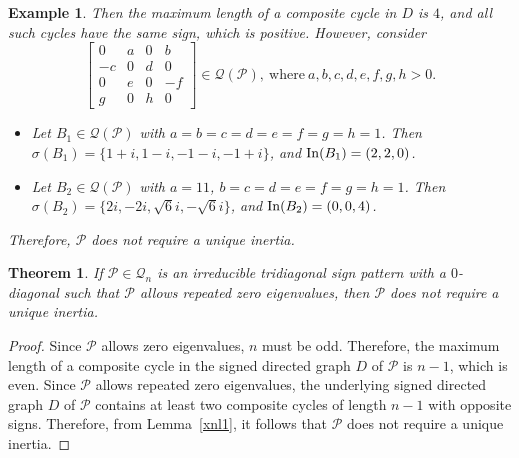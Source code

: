 \documentclass[a4paper, 10pt]{article}
\newtheorem{theorem}{Theorem}[section]
\newtheorem{eg}{Example}[section]
\numberwithin{equation}{section}
\def\In{{\rm In}}
\begin{document}
\begin{eg}
		Then the maximum length of a composite cycle in $D$ is $4$, and all such cycles have the same sign, which is positive. However, consider	$$\begin{bmatrix}
			0&a&0&b\\ -c&0&d&0\\ 0&e&0&-f\\ g&0&h&0
		\end{bmatrix}\in \mathcal{Q}(\mathcal{P}), ~\text{where}~ a,b,c,d,e,f,g,h>0.$$ \begin{itemize}
			\item[i.] Let $B_1 \in \mathcal{Q}(\mathcal{P})$ with $a = b = c = d = e = f = g = h = 1$. Then $\sigma(B_1) = \{1+i, 1-i,-1-i,-1+i\}$, and $\In(B_1) = (2, 2, 0)$.
			\item[ii.] Let $B_2 \in \mathcal{Q}(\mathcal{P})$ with $a = 11$, $ b = c = d = e = f = g = h = 1$. Then $\sigma(B_2) = \{2i,-2i,\sqrt{6}i,-\sqrt{6}i\}$, and $\In(B_2) = (0, 0, 4)$.
		\end{itemize}
		Therefore, $\mathcal{P}$ does not require a unique inertia.
	\end{eg}
	
	\begin{theorem} \label{l3.1n}
		If $\mathcal{P}\in \mathcal{Q}_n$ is an irreducible tridiagonal sign pattern with a $0$-diagonal such that $\mathcal{P}$ allows repeated zero eigenvalues, then $\mathcal{P}$ does not require a unique inertia.
	\end{theorem}
	\begin{proof} Since $\mathcal{P}$ allows zero eigenvalues, $n$ must be odd. Therefore, the maximum length of a composite cycle in the signed directed graph $D$ of $\mathcal{P}$ is $n-1$, which is even. Since $\mathcal{P}$ allows repeated zero eigenvalues, the underlying signed directed graph $D$ of $\mathcal{P}$ contains at least two composite cycles of length $n - 1$ with opposite signs.
		Therefore, from Lemma~\ref{xnl1}, it follows that $\mathcal{P}$ does not require a unique inertia.
	\end{proof}
	
\end{document}
